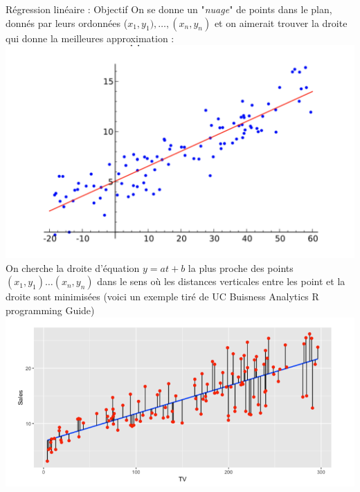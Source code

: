         \begin{parag}{Régression linéaire : Objectif}
            On se donne un "\textit{nuage}" de points dans le plan, donnés par leurs ordonnées ($x_1, y_1), \dots, (x_n, y_n)$ et on aimerait trouver la droite qui donne la meilleures approximation :
            \includegraphics[scale=0.3]{Algèbre linéaire/Screenshot 2024-12-10 153727.png}
            On cherche la droite d'équation $y = at + b$ la plus proche des points $(x_1, y_1)\dots (x_n, y_n)$ dans le sens où les distances verticales entre les point et la droite sont minimisées (voici un exemple tiré de UC Buisness Analytics R programming Guide)
            \includegraphics[scale = 0.5]{Algèbre linéaire/Screenshot 2024-12-10 153930.png}
        \end{parag}
